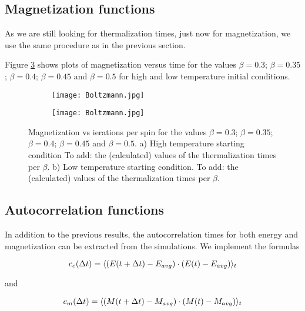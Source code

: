 \documentclass[11pt,a4paper]{article}
\DeclarePairedDelimiter{\avg}{\langle}{\rangle}
\begin{document}
\subsection{Magnetization functions}
As we are still looking for thermalization times, just now for magnetization, we use the same procedure as in
 the previous section. 

Figure \ref{fig:Mvt} shows plots of magnetization versus time for the values $\beta = 0.3$; $\beta = 0.35$;
 $\beta = 0.4$; $\beta = 0.45$ and $\beta = 0.5$ for high and low temperature initial conditions. 


\begin{figure}[h!]
\centering
\begin{subfigure}{.5\textwidth}
  \centering
  \texttt{[image: Boltzmann.jpg]}
  \caption{}
  \label{fig:Mvt_highT}
\end{subfigure}%
\begin{subfigure}{.5\textwidth}
  \centering
  \texttt{[image: Boltzmann.jpg]}
  \caption{}
  \label{fig:Mvt_lowT}
\end{subfigure}
\caption{Magnetization vs ierations per spin for the values $\beta = 0.3$; $\beta = 0.35$;
         $\beta = 0.4$; $\beta = 0.45$ and $\beta = 0.5$. a) High temperature starting condition
         {\color{red}To add: the (calculated) values of the thermalization times per $\beta$}.
         b) Low temperature starting condition.
         {\color{red}To add: the (calculated) values of the thermalization times per $\beta$}.}
\label{fig:Mvt}
\end{figure}


\subsection{Autocorrelation functions}
In addition to the previous results, the autocorrelation times for both energy and magnetization can be
 extracted from the simulations. We implement the formulas

\begin{equation*}
    c_e(\Delta t) = \avg{(E(t+\Delta t) - E_{avg})\cdot (E(t)-E_{avg})}_t
\end{equation*}

and

\begin{equation*}
    c_m(\Delta t) = \avg{(M(t+\Delta t) - M_{avg})\cdot (M(t)-M_{avg})}_t
\end{equation*}
\end{document}

